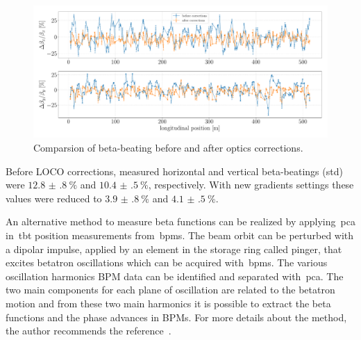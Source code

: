 \begin{figure}
\centering
\includegraphics[width=1.0\textwidth]{figures/beta_beating_progress_big.pdf}
\caption{Comparsion of beta-beating before and after optics corrections.}
\label{fig:beta_beating_progress}
\end{figure}

Before LOCO corrections, measured horizontal and vertical beta-beatings (std) were $\SI{12.8(8)}{\%}$ and $\SI{10.4(5)}{\%}$, respectively. With new gradients settings these values were reduced to $\SI{3.9(8)}{\%}$ and $\SI{4.1(5)}{\%}$.

An alternative method to measure beta functions can be realized by applying~\gls{pca} in~\gls{tbt} position measurements from~\glspl{bpm}. The beam orbit can be perturbed with a dipolar impulse, applied by an element in the storage ring called pinger, that excites betatron oscillations which can be acquired with~\glspl{bpm}. The various oscillation harmonics BPM data can be identified and separated with~\gls{pca}. The two main components for each plane of oscillation are related to the betatron motion and from these two main harmonics it is possible to extract the beta functions and the phase advances in BPMs. For more details about the method, the author recommends the reference~\cite{huang2019beam}.

